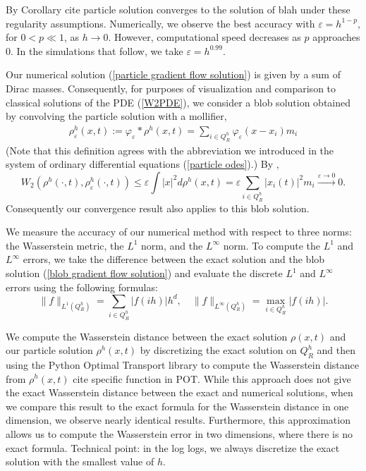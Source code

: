 \documentclass[11pt,leqno]{amsart}
\theoremstyle{definition}
\def\epsilon{\varepsilon}
\def\e{\varepsilon}
\begin{document}
{\color{Aquamarine} By Corollary cite particle solution converges to the solution of blah under these regularity assumptions.} Numerically, we observe the best accuracy with $\epsilon = h^{1- p}$, for $0 < p \ll 1$, as $h \to 0$. However, computational speed decreases as $p$ approaches 0. In the simulations that follow, we take $\epsilon = h^{0.99}$.

Our numerical solution (\ref{particle gradient flow solution}) is given by a sum of Dirac masses. Consequently, for purposes of visualization and comparison to classical solutions of the PDE (\ref{W2PDE}), we consider a blob solution obtained by convolving the particle solution with a mollifier,
\begin{align} \label{blob gradient flow solution}
\rho_\epsilon^h(x,t) := \varphi_\e* \rho^h(x,t)  = \sum_{i \in Q_R^h}\varphi_\e(x - x_i) m_i
\end{align}
(Note that this definition agrees with the abbreviation we introduced in the system of ordinary differential equations (\ref{particle odes}).) By \cite[Lemma 7.1.10]{AGS},
\[ W_2(\rho^h(\cdot, t), \rho^h_\epsilon(\cdot, t)) \leq \epsilon \int |x|^2 d \rho^h(x,t) = \epsilon \sum_{i \in Q^h_R} |x_i(t)|^2 m_i \xrightarrow{\epsilon \to 0} 0 . \]
Consequently {\color{Aquamarine} our convergence result also applies to this blob solution.}

We measure the accuracy of our numerical method with respect to three norms: the Wasserstein metric, the $L^1$ norm, and the $L^\infty$ norm. To compute the $L^1$ and $L^\infty$ errors, we take the difference between the exact solution and the blob solution (\ref{blob gradient flow solution}) and evaluate the discrete $L^1$ and $L^\infty$ errors using the following formulas:
\[ \|f\|_{L^1(Q_R^h)} = \sum_{i \in Q_R^h} | f(ih) | h^d , \quad  \|f\|_{L^\infty(Q_R^h)} = \max_{i \in Q_R^h} | f(ih)| . \] 

We compute the Wasserstein distance between the exact solution $\rho(x,t)$ and our particle solution $\rho^h(x,t)$ by discretizing the exact solution on $Q_R^h$ and then using the Python Optimal Transport library to compute the Wasserstein distance from $\rho^h(x,t)$ {\color{Aquamarine} cite specific function in POT.} While this approach does not give the exact Wasserstein distance between the exact and numerical solutions, when we compare this result to the exact formula for the Wasserstein distance in one dimension, we observe nearly identical results. Furthermore, this approximation allows us to compute the Wasserstein error in two dimensions, where there is no exact formula. {\color{Aquamarine} Technical point: in the log logs, we always discretize the exact solution with the smallest value of $h$.}
\end{document}
